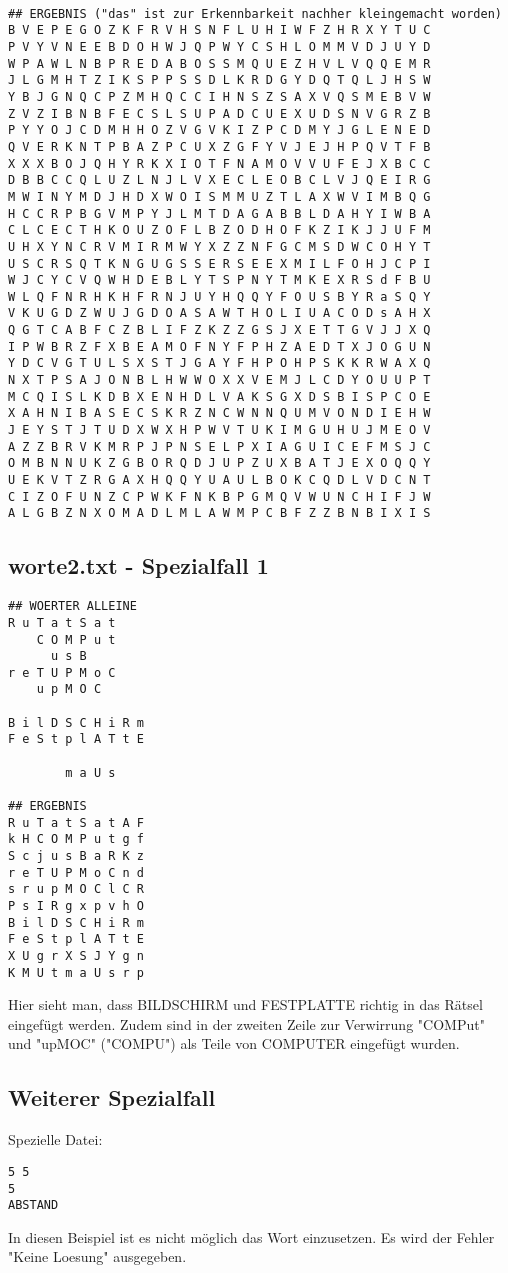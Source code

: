 \documentclass[a4paper,10pt,ngerman]{scrartcl}
\begin{document}
\begin{lstlisting}
                                                           
## ERGEBNIS ("das" ist zur Erkennbarkeit nachher kleingemacht worden)
B V E P E G O Z K F R V H S N F L U H I W F Z H R X Y T U C
P V Y V N E E B D O H W J Q P W Y C S H L O M M V D J U Y D
W P A W L N B P R E D A B O S S M Q U E Z H V L V Q Q E M R
J L G M H T Z I K S P P S S D L K R D G Y D Q T Q L J H S W
Y B J G N Q C P Z M H Q C C I H N S Z S A X V Q S M E B V W
Z V Z I B N B F E C S L S U P A D C U E X U D S N V G R Z B
P Y Y O J C D M H H O Z V G V K I Z P C D M Y J G L E N E D
Q V E R K N T P B A Z P C U X Z G F Y V J E J H P Q V T F B
X X X B O J Q H Y R K X I O T F N A M O V V U F E J X B C C
D B B C C Q L U Z L N J L V X E C L E O B C L V J Q E I R G
M W I N Y M D J H D X W O I S M M U Z T L A X W V I M B Q G
H C C R P B G V M P Y J L M T D A G A B B L D A H Y I W B A
C L C E C T H K O U Z O F L B Z O D H O F K Z I K J J U F M
U H X Y N C R V M I R M W Y X Z Z N F G C M S D W C O H Y T
U S C R S Q T K N G U G S S E R S E E X M I L F O H J C P I
W J C Y C V Q W H D E B L Y T S P N Y T M K E X R S d F B U
W L Q F N R H K H F R N J U Y H Q Q Y F O U S B Y R a S Q Y
V K U G D Z W U J G D O A S A W T H O L I U A C O D s A H X
Q G T C A B F C Z B L I F Z K Z Z G S J X E T T G V J J X Q
I P W B R Z F X B E A M O F N Y F P H Z A E D T X J O G U N
Y D C V G T U L S X S T J G A Y F H P O H P S K K R W A X Q
N X T P S A J O N B L H W W O X X V E M J L C D Y O U U P T
M C Q I S L K D B X E N H D L V A K S G X D S B I S P C O E
X A H N I B A S E C S K R Z N C W N N Q U M V O N D I E H W
J E Y S T J T U D X W X H P W V T U K I M G U H U J M E O V
A Z Z B R V K M R P J P N S E L P X I A G U I C E F M S J C
O M B N N U K Z G B O R Q D J U P Z U X B A T J E X O Q Q Y
U E K V T Z R G A X H Q Q Y U A U L B O K C Q D L V D C N T
C I Z O F U N Z C P W K F N K B P G M Q V W U N C H I F J W
A L G B Z N X O M A D L M L A W M P C B F Z Z B N B I X I S
\end{lstlisting}

\subsection{worte2.txt - Spezialfall 1}
\begin{lstlisting}
## WOERTER ALLEINE
R u T a t S a t    
    C O M P u t    
      u s B        
r e T U P M o C    
    u p M O C      
                   
B i l D S C H i R m
F e S t p l A T t E
                   
        m a U s    

## ERGEBNIS
R u T a t S a t A F
k H C O M P u t g f
S c j u s B a R K z
r e T U P M o C n d
s r u p M O C l C R
P s I R g x p v h O
B i l D S C H i R m
F e S t p l A T t E
X U g r X S J Y g n
K M U t m a U s r p
\end{lstlisting}
Hier sieht man, dass BILDSCHIRM und FESTPLATTE richtig in das Rätsel eingefügt werden.
Zudem sind in der zweiten Zeile zur Verwirrung "COMPut" und "upMOC" ("COMPU") als Teile von COMPUTER
eingefügt wurden.\medskip
\subsection{Weiterer Spezialfall}
Spezielle Datei:
\begin{lstlisting}
5 5
5
ABSTAND
\end{lstlisting}
In diesen Beispiel ist es nicht möglich das Wort einzusetzen. Es wird der Fehler "Keine Loesung" ausgegeben.
\end{document}
